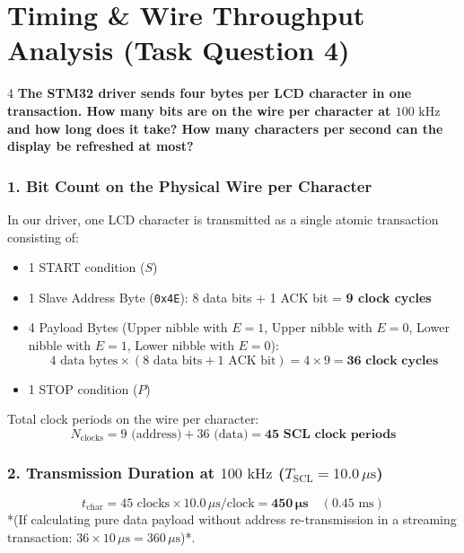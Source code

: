 \documentclass[11pt,a4paper]{article}
\begin{document}
\section{Timing \& Wire Throughput Analysis (Task Question 4)}

\begin{questionbox}{4}
\textbf{The STM32 driver sends four bytes per LCD character in one transaction. How many bits are on the wire per character at $100\text{ kHz}$ and how long does it take? How many characters per second can the display be refreshed at most?}
\end{questionbox}

\subsubsection*{1. Bit Count on the Physical Wire per Character}
In our driver, one LCD character is transmitted as a single atomic transaction consisting of:
\begin{itemize}
    \item 1 START condition ($S$)
    \item 1 Slave Address Byte (\texttt{0x4E}): 8 data bits + 1 ACK bit = \textbf{9 clock cycles}
    \item 4 Payload Bytes (Upper nibble with $E=1$, Upper nibble with $E=0$, Lower nibble with $E=1$, Lower nibble with $E=0$):
    \begin{equation}
    4\text{ data bytes} \times (8\text{ data bits} + 1\text{ ACK bit}) = 4 \times 9 = \mathbf{36\text{ clock cycles}}
    \end{equation}
    \item 1 STOP condition ($P$)
\end{itemize}
Total clock periods on the wire per character:
\begin{equation}
N_{\text{clocks}} = 9\text{ (address)} + 36\text{ (data)} = \mathbf{45\text{ SCL clock periods}}
\end{equation}

\subsubsection*{2. Transmission Duration at $100\text{ kHz}$ ($T_{\text{SCL}} = 10.0\,\mu\text{s}$)}
\begin{equation}
t_{\text{char}} = 45\text{ clocks} \times 10.0\,\mu\text{s/clock} = \mathbf{450\,\mu\text{s}} \quad (0.45\text{ ms})
\end{equation}
*(If calculating pure data payload without address re-transmission in a streaming transaction: $36 \times 10\,\mu\text{s} = 360\,\mu\text{s}$)*.
\end{document}
